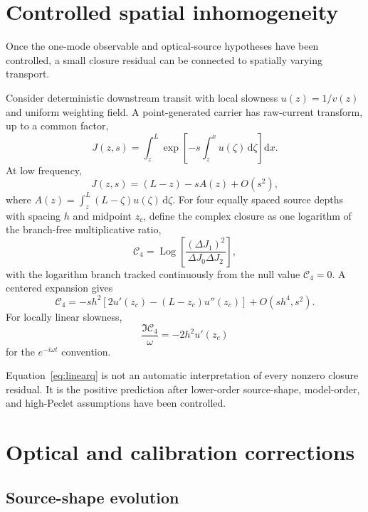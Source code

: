 \documentclass[11pt]{article}
\newcommand{\Cfour}{\mathcal{C}_4}
\newcommand{\dd}{\mathrm{d}}
\begin{document}
\section{Controlled spatial inhomogeneity}

Once the one-mode observable and optical-source hypotheses have been controlled, a small closure residual can be connected to spatially varying transport.

Consider deterministic downstream transit with local slowness $u(z)=1/v(z)$ and uniform weighting field. A point-generated carrier has raw-current transform, up to a common factor,
\begin{equation}
J(z,s)=\int_z^L
\exp\left[-s\int_z^x u(\zeta)\,\dd \zeta\right]\dd x.
\label{eq:Jvarying}
\end{equation}
At low frequency,
\begin{equation}
J(z,s)=(L-z)-sA(z)+O(s^2),
\end{equation}
where $A(z)=\int_z^L(L-\zeta)u(\zeta)\,\dd \zeta$. For four equally spaced source depths with spacing $h$ and midpoint $z_c$, define the complex closure as one logarithm of the branch-free multiplicative ratio,
\begin{equation}
\boxed{
\Cfour=\operatorname{Log}\!\left[\frac{(\Delta J_1)^2}{\Delta J_0\Delta J_2}\right],}
\label{eq:C4_logratio}
\end{equation}
with the logarithm branch tracked continuously from the null value $\Cfour=0$. A centered expansion gives
\begin{equation}
\boxed{
\Cfour=-s h^2\left[2u'(z_c)-(L-z_c)u''(z_c)\right]
+O(sh^4,s^2).}
\label{eq:gradienttheorem}
\end{equation}
For locally linear slowness,
\begin{equation}
\boxed{
\frac{\Im\Cfour}{\omega}=-2h^2u'(z_c)}
\label{eq:linearq}
\end{equation}
for the $e^{-i\omega t}$ convention.

Equation~\eqref{eq:linearq} is not an automatic interpretation of every nonzero closure residual. It is the positive prediction after lower-order source-shape, model-order, and high-Peclet assumptions have been controlled.

\section{Optical and calibration corrections}

\subsection{Source-shape evolution}
\end{document}
